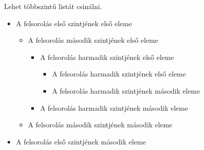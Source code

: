 \documentclass[12pt,a4paper]{article}
\begin{document}
		Lehet többszintű listát csinálni.
		\begin{itemize}
            \item A felsorolás első szintjének első eleme
            \begin{itemize}
                \item A felsorolás második szintjének első eleme
                \begin{itemize}
                    \item A felsorolás harmadik szintjének első eleme
                    \begin{itemize}
                        \item A felsorolás harmadik szintjének első eleme
                        \item A felsorolás harmadik szintjének második eleme
                    \end{itemize}
                    \item A felsorolás harmadik szintjének második eleme
                \end{itemize}
                \item A felsorolás második szintjének második eleme
            \end{itemize}
          \item A felsorolás első szintjének második eleme
        \end{itemize}
		
\end{document}
